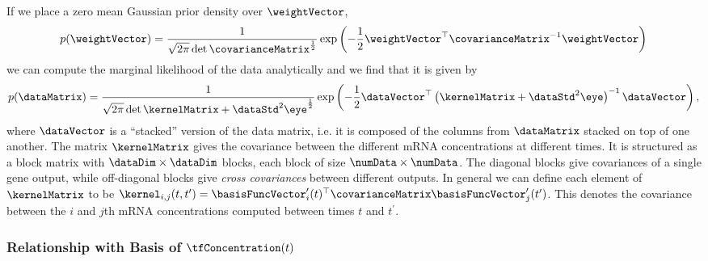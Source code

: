 \documentclass{article}
\begin{document}
If we place a zero mean Gaussian prior density over $\weightVector$,
\[
p(\weightVector)=\frac{1}{\sqrt{2\pi}\det{\covarianceMatrix}^{\frac{1}{2}}}\exp\left(-\frac{1}{2}\weightVector^\top \covarianceMatrix^{-1}\weightVector\right)
\]
we can compute the marginal likelihood of the data analytically and we
find that it is
given by
\[
p(\dataMatrix) = \frac{1}{\sqrt{2\pi}\det{\kernelMatrix + \dataStd^2\eye}^\frac{1}{2}}\exp\left(-\frac{1}{2}\dataVector^\top \left(\kernelMatrix + \dataStd^2\eye\right)^{-1}\dataVector\right),
\]
where $\dataVector$ is a ``stacked'' version of the data matrix,
i.e. it is composed of the columns from $\dataMatrix$ stacked on top
of one another. The matrix $\kernelMatrix$ gives the covariance
between the different mRNA concentrations at different times. It is
structured as a block matrix with $\dataDim\times\dataDim$ blocks,
each block of size $\numData\times\numData$. The diagonal blocks give
covariances of a single gene output, while off-diagonal blocks give
\emph{cross covariances} between different outputs. In general we can define
each element of $\kernelMatrix$ to be $\kernel_{i,j}(t, t^\prime) =
\basisFuncVector^\prime_i(t)^\top\covarianceMatrix\basisFuncVector^\prime_j(t')$. This
denotes the covariance between the $i$ and $j$th mRNA concentrations
computed between times $t$ and $t^\prime$. %


\subsubsection{Relationship with Basis of $\tfConcentration(t)$}
\end{document}
